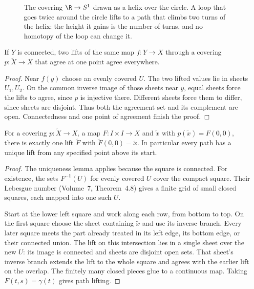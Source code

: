 \begin{figure}[ht]
\centering
{}
\caption{The covering $\R\to S^1$ drawn as a helix over the circle. A loop that goes twice around the circle lifts to a path that climbs two turns of the helix: the
height it gains is the number of turns, and no homotopy of the loop can change it.}
\label{fig:helix}
\end{figure}

\begin{lemma}\label{lem:uniquelift}
If $Y$ is connected, two lifts of the same map $f:Y\to X$ through a covering $p:\tilde X\to X$ that agree at one point agree everywhere.
\end{lemma}

\begin{proof}
Near $f(y)$ choose an evenly covered $U$. The two lifted values lie in sheets $U_1,U_2$. On the common inverse image of those sheets near $y$, equal sheets force the lifts to agree, since $p$ is injective there. Different sheets force them to differ, since sheets are disjoint. Thus both the agreement set and its complement are open. Connectedness and one point of agreement finish the proof.
\end{proof}

\begin{theorem}\label{thm:homotopylifting}
For a covering $p:\tilde X\to X$, a map $F:I\times I\to X$ and $\tilde x$ with $p(\tilde x)=F(0,0)$, there is exactly one lift $\tilde F$ with $\tilde F(0,0)=\tilde x$. In particular every path has a unique lift from any specified point above its start.
\end{theorem}

\begin{proof}
The uniqueness lemma applies because the square is connected. For existence, the sets $F^{-1}(U)$ for evenly covered $U$ cover the compact square. Their Lebesgue number (Volume~7, Theorem~4.8) gives a finite grid of small closed squares, each mapped into one such $U$.

Start at the lower left square and work along each row, from bottom to top. On the first square choose the sheet containing $\tilde x$ and use its inverse branch. Every later square meets the part already treated in its left edge, its bottom edge, or their connected union. The lift on this intersection lies in a single sheet over the new $U$: its image is connected and sheets are disjoint open sets. That sheet's inverse branch extends the lift to the whole square and agrees with the earlier lift on the overlap. The finitely many closed pieces glue to a continuous map. Taking $F(t,s)=\gamma(t)$ gives path lifting.
\end{proof}

